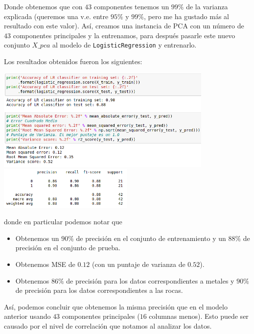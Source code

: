 \documentclass[letterpaper,11pt]{article}
\begin{document}
\begin{enumerate}
    Donde obtenemos que con $43$ componentes tenemos un $99\%$ de la 
    varianza explicada (queremos una v.e. entre $95\%$ y $99\%$, pero me ha 
    gustado más al resultado con este valor). Así, creamos una instancia 
    de PCA con un número de $43$ componentes principales y la entrenamos, 
    para después pasarle este nuevo conjunto $X\_pca$ al modelo de 
    \texttt{LogisticRegression} y entrenarlo.

    Los resultados obtenidos fueron los siguientes:
    \begin{center}
        \includegraphics[width=0.8\textwidth]{imagenes/sonar-pca3.png}
        \includegraphics[width=0.5\textwidth]{imagenes/sonar-pca4.png}
    \end{center}

    donde en particular podemos notar que 
    \begin{itemize}
        \item Obtenemos un $90\%$ de precisión en el conjunto de entrenamiento 
        y un $88\%$ de precisión en el conjunto de prueba.

        \item Obtenemos MSE de $0.12$ (con un puntaje de varianza de $0.52$).

        \item Obtenemos $86\%$ de precisión para los datos correspondientes a 
        metales y $90\%$ de precisión para los datos correspondientes a las 
        rocas.
    \end{itemize}

    Así, podemos concluir que obtenemos la misma precisión que en el modelo 
    anterior usando $43$ componentes principales ($16$ columnas menos). Esto 
    puede ser causado por el nivel de correlación que notamos al analizar los 
    datos.


\end{enumerate}
\end{document}
